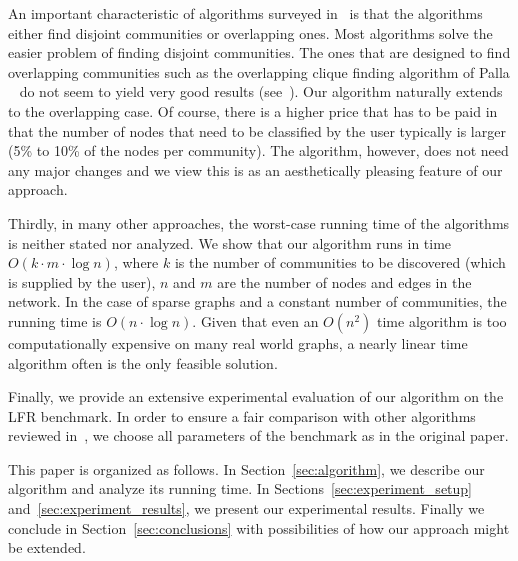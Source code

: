An important characteristic of algorithms surveyed in~\cite{LF09} 
is that the algorithms either find disjoint communities or overlapping 
ones. Most algorithms solve the easier problem of finding disjoint communities. 
The ones that are designed to find overlapping communities such as the overlapping clique finding 
algorithm of Palla \etal~\cite{PDFV05} do not seem to yield very good results (see~\cite{LF09}).
Our algorithm naturally extends to the overlapping case. Of course, there is a higher 
price that has to be paid in that the number of nodes that need to be classified by the user 
typically is larger (5\% to 10\% of the nodes per community). The algorithm, however,
does not need any major changes and we view this is as an aesthetically pleasing 
feature of our approach. 

Thirdly, in many other approaches, the worst-case running time of the algorithms 
is neither stated nor analyzed. We show that our algorithm runs in time $O(k \cdot m \cdot \log n)$, 
where $k$ is the number of communities to be discovered (which is supplied by the user), 
$n$ and $m$ are the number of nodes and edges in the network. In the case of sparse graphs 
and a constant number of communities, the running time is $O(n \cdot \log n)$. Given that even 
an $O(n^2)$ time algorithm is too computationally expensive on many real world graphs, 
a nearly linear time algorithm often is the only feasible solution.   

Finally, we provide an extensive experimental evaluation of our algorithm on the 
LFR benchmark. In order to ensure a fair comparison with other algorithms 
reviewed in~\cite{LF09}, we choose all parameters of the benchmark as in the original paper.


This paper is organized as follows. In Section~\ref{sec:algorithm}, we 
describe our algorithm and analyze its running time. In Sections~\ref{sec:experiment_setup} 
and~\ref{sec:experiment_results}, we present our experimental results. Finally we conclude 
in Section~\ref{sec:conclusions} with possibilities of how our approach might be extended. 



